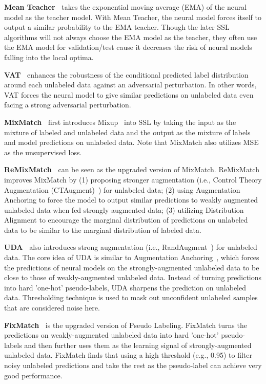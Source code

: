 \documentclass{article}
\begin{document}
\textbf{Mean Teacher~\cite{tarvainen2017mean}} takes the exponential moving average (EMA) of the neural model as the teacher model. With Mean Teacher, the neural model forces itself to output a similar probability to the EMA teacher. Though the later SSL algorithms will not always choose the EMA model as the teacher, they often use the EMA model for validation/test cause it decreases the risk of neural models falling into the local optima.

\textbf{VAT~\cite{miyato2018virtual}} enhances the robustness of the conditional predicted label distribution around
each unlabeled data against an adversarial perturbation. In other words, VAT forces the neural model to give similar predictions on unlabeled data even facing a strong adversarial perturbation.
 
\textbf{MixMatch~\cite{berthelot2019mixmatch}} first introduces Mixup~\cite{zhang2018mixup} into SSL by taking the input as the mixture of labeled and unlabeled data and the output as the mixture of labels and model predictions on unlabeled data. Note that MixMatch also utilizes MSE as the unsupervised loss.

\textbf{ReMixMatch~\cite{berthelot2019remixmatch}} can be seen as the upgraded version of MixMatch. ReMixMatch improves MixMatch by (1) proposing stronger augmentation (i.e., Control Theory Augmentation (CTAugment)~\cite{berthelot2019remixmatch}) for unlabeled data; (2) using Augmentation Anchoring to force the model to output similar predictions to weakly augmented unlabeled data when fed strongly augmented data; (3) utilizing Distribution Alignment to encourage the marginal distribution of
predictions on unlabeled data to be similar to the marginal distribution of labeled data. 

\textbf{UDA~\cite{xie2020unsupervised}} also introduces strong augmentation (i.e., RandAugment~\cite{cubuk2020randaugment}) for unlabeled data. The core idea of UDA is similar to Augmentation Anchoring~\cite{berthelot2019remixmatch}, which forces the predictions of neural models on the strongly-augmented unlabeled data to be close to those of weakly-augmented unlabeled data. Instead of turning predictions into hard 'one-hot' pseudo-labels, UDA sharpens the prediction on unlabeled data. Thresholding technique is used to mask out unconfident unlabeled samples that are considered noise here. 


\textbf{FixMatch~\cite{sohn2020fixmatch}} is the upgraded version of Pseudo Labeling. FixMatch turns the predictions on weakly-augmented unlabeled data into hard 'one-hot' pseudo-labels and then further uses them as the learning signal of strongly-augmented unlabeled data. FixMatch finds that using a high threshold (e.g., 0.95) to filter noisy unlabeled predictions and take the rest as the pseudo-label can achieve very good performance.
\end{document}
